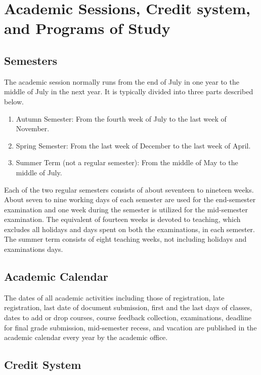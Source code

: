 

\section{Academic Sessions, Credit system, and Programs of Study}

\subsection{Semesters}

The academic session normally runs from the end of July in one year to the middle of July in the next year. It is typically divided into three parts described below.

\begin{enumerate}
	\item Autumn Semester: From the fourth week of July to the last week of November.
	\item Spring Semester: From the last week of December to the last week of April.
	\item Summer Term (not a regular semester): From the middle of May to the middle of July.
\end{enumerate}

Each of the two regular semesters consists of about seventeen to nineteen weeks. About seven to nine working days of each semester are used for the end-semester examination and one week during the semester is utilized for the mid-semester examination. The equivalent of fourteen weeks is devoted to teaching, which excludes all holidays and days spent on both the examinations, in each semester. The summer term consists of eight teaching weeks, not including holidays and examinations days.

\subsection{Academic Calendar}

The dates of all academic activities including those of registration, late registration, last date of document submission, first and the last days of classes, dates to add or drop courses, course feedback collection, examinations, deadline for final grade submission, mid-semester recess, and vacation are published in the academic calendar every year by the academic office.

\subsection{Credit System}

